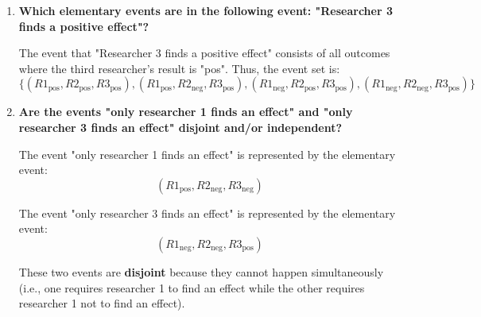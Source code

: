 \documentclass[a4paper, 12pt]{article}
\begin{document}
\begin{enumerate}
\begin{center}
\end{center}
    \item \textbf{Which elementary events are in the following event: "Researcher 3 finds a positive effect"?}
    
    The event that "Researcher 3 finds a positive effect" consists of all outcomes where the third researcher's result is "pos". Thus, the event set is:
    \[
    \{(R1_{\text{pos}}, R2_{\text{pos}}, R3_{\text{pos}}), (R1_{\text{pos}}, R2_{\text{neg}}, R3_{\text{pos}}), (R1_{\text{neg}}, R2_{\text{pos}}, R3_{\text{pos}}), (R1_{\text{neg}}, R2_{\text{neg}}, R3_{\text{pos}})\}
    \]
    
    \item \textbf{Are the events "only researcher 1 finds an effect" and "only researcher 3 finds an effect" disjoint and/or independent?}
    
    The event "only researcher 1 finds an effect" is represented by the elementary event:
    \[
    (R1_{\text{pos}}, R2_{\text{neg}}, R3_{\text{neg}})
    \]
    
    The event "only researcher 3 finds an effect" is represented by the elementary event:
    \[
    (R1_{\text{neg}}, R2_{\text{neg}}, R3_{\text{pos}})
    \]
    
    These two events are \textbf{disjoint} because they cannot happen simultaneously (i.e., one requires researcher 1 to find an effect while the other requires researcher 1 not to find an effect). 
    

\end{enumerate}
\end{document}
